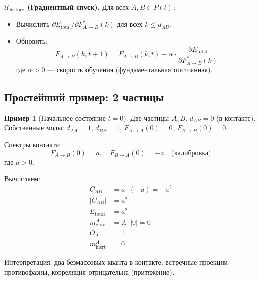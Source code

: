 \documentclass[11pt,a4paper]{article}
\theoremstyle{definition}
\newtheorem{example}{Пример}[section]
\begin{document}
\textbf{$\mathcal{U}_{\text{history}}$ (Градиентный спуск).}
Для всех $A, B \in P(t)$:
\begin{itemize}
    \item Вычислить $\partial E_{\text{total}} / \partial F_{A \to B}^*(k)$ для всех $k \leq d_{AB}$.
    \item Обновить:
    \begin{equation}
        F_{A \to B}(k, t+1) = F_{A \to B}(k, t) - \alpha \cdot \frac{\partial E_{\text{total}}}{\partial F_{A \to B}^*(k)}
    \end{equation}
    где $\alpha > 0$ --- скорость обучения (фундаментальная постоянная).
\end{itemize}

\subsection{Простейший пример: 2 частицы}

\begin{example}[Начальное состояние $t=0$]
Две частицы $A, B$. $d_{AB} = 0$ (в контакте).
Собственные моды: $d_{AA} = 1$, $d_{BB} = 1$, $F_{A \to A}(0) = 0$, $F_{B \to B}(0) = 0$.

Спектры контакта:
\begin{equation}
    F_{A \to B}(0) = a, \quad F_{B \to A}(0) = -a \quad \text{(калибровка)}
\end{equation}
где $a > 0$.

Вычисляем:
\begin{align}
    C_{AB} &= a \cdot (-a) = -a^2 \\
    |C_{AB}| &= a^2 \\
    E_{\text{total}} &= a^2 \\
    m_{\text{grav}}^A &= \Lambda \cdot |0| = 0 \\
    O_A &= 1 \\
    m_{\text{inert}}^A &= 0
\end{align}

Интерпретация: два безмассовых кванта в контакте, встречные проекции противофазны, корреляция отрицательна (притяжение).
\end{example}
\end{document}
